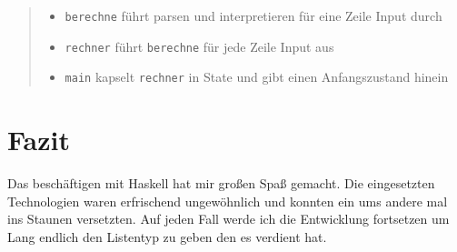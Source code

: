 \documentclass[12pt,german]{article}
\begin{document}
\begin{abstract}
  \noindent
  \begin{itemize}
  \item \texttt{berechne} führt parsen und interpretieren für eine
    Zeile Input durch
  \item \texttt{rechner} führt \texttt{berechne} für jede Zeile Input
    aus
  \item \texttt{main} kapselt \texttt{rechner} in State und gibt einen
    Anfangszustand hinein
  \end{itemize}
\end{abstract}

\section{Fazit}

Das beschäftigen mit Haskell hat mir großen Spaß gemacht. Die
eingesetzten Technologien waren erfrischend ungewöhnlich und konnten
ein ums andere mal ins Staunen versetzten. Auf jeden Fall werde ich
die Entwicklung fortsetzen um Lang endlich den Listentyp zu geben den
es verdient hat.

\newpage


\end{document}
